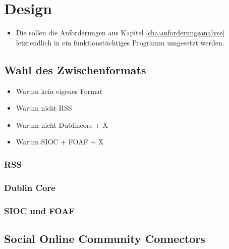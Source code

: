 
\chapter{Design} %
\label{cha:design}


\begin{itemize}
    \item Die sollen die Anforderungen aus Kapitel \ref{cha:anforderungsanalyse} letztendlich in ein funktionstüchtiges Programm umgesetzt werden. 
\end{itemize}


\section{Wahl des Zwischenformats} %
\label{sec:selection_of_the_itermediate_format}
\begin{itemize}
    \item Warum kein eigenes Format
    \item Warum nicht RSS 
    \item Warum nicht Dublincore + X
    \item Warum SIOC + FOAF + X
\end{itemize}

\subsection{RSS} %
\label{sub:rss}

\subsection{Dublin Core} %
\label{sub:dublin_core}

\subsection{SIOC und FOAF} %
\label{sub:sioc_und_foaf}



\section{Social Online Community Connectors} %
\label{sec:connectors}

